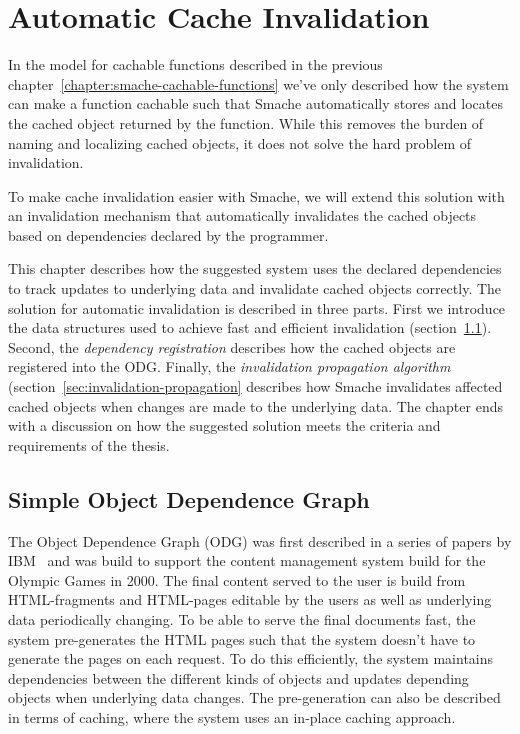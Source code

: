 \chapter{Automatic Cache Invalidation}
\label{chapter:invalidation}

In the model for cachable functions described in the previous chapter~\ref{chapter:smache-cachable-functions} we've only described how the system can make a function cachable such that Smache automatically stores and locates the cached object returned by the function. While this removes the burden of naming and localizing cached objects, it does not solve the hard problem of invalidation.

To make cache invalidation easier with Smache, we will extend this solution with an invalidation mechanism that automatically invalidates the cached objects based on dependencies declared by the programmer.

This chapter describes how the suggested system uses the declared dependencies to track updates to underlying data and invalidate cached objects correctly. The solution for automatic invalidation is described in three parts. First we introduce the data structures used to achieve fast and efficient invalidation (section~\ref{sec:simple-object-dependence-graph}). Second, the \emph{dependency registration} describes how the cached objects are registered into the ODG. Finally, the \emph{invalidation propagation algorithm} (section~\ref{sec:invalidation-propagation} describes how Smache invalidates affected cached objects when changes are made to the underlying data. The chapter ends with a discussion on how the suggested solution meets the criteria and requirements of the thesis.


\section{Simple Object Dependence Graph}
\label{sec:simple-object-dependence-graph}

The Object Dependence Graph (ODG) was first described in a series of papers by IBM~\cite{paper:ibm, paper:ibm-extended} and was build to support the content management system build for the Olympic Games in 2000. The final content served to the user is build from HTML-fragments and HTML-pages editable by the users as well as underlying data periodically changing. To be able to serve the final documents fast, the system pre-generates the HTML pages such that the system doesn't have to generate the pages on each request. To do this efficiently, the system maintains dependencies between the different kinds of objects and updates depending objects when underlying data changes. The pre-generation can also be described in terms of caching, where the system uses an in-place caching approach.

